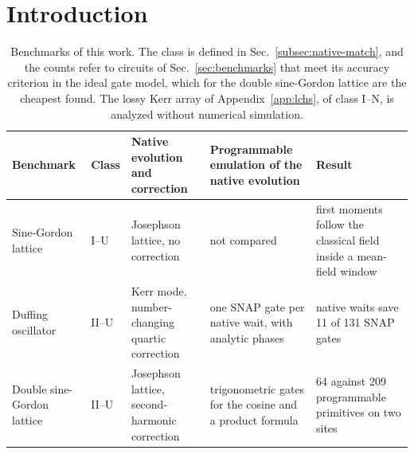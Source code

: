 \documentclass[pra,twocolumn,superscriptaddress,nofootinbib,floatfix]{revtex4-2}
\theoremstyle{remark}
\newcommand{\revcolor}{\color{blue}}
\begin{document}
\section{Introduction}
\label{sec:intro}

\begin{table}[t]
\revcolor
\caption{Benchmarks of this work. The class is defined in Sec.~\ref{subsec:native-match}, and the counts refer to circuits of Sec.~\ref{sec:benchmarks} that meet its accuracy criterion in the ideal gate model, which for the double sine-Gordon lattice are the cheapest found. The lossy Kerr array of Appendix~\ref{app:lchs}, of class I--N, is analyzed without numerical simulation.}
\label{tab:classes}
\begin{ruledtabular}
\begin{tabular}{L{2.5cm}L{0.8cm}L{3.5cm}L{4.1cm}L{4.4cm}}
Benchmark & Class & Native evolution and correction & Programmable emulation of the native evolution & Result \\
\hline
Sine-Gordon lattice & I--U & Josephson lattice, no correction & not compared & first moments follow the classical field inside a mean-field window \\
Duffing oscillator & II--U & Kerr mode, number-changing quartic correction & one SNAP gate per native wait, with analytic phases & native waits save 11 of 131 SNAP gates \\
Double sine-Gordon lattice & II--U & Josephson lattice, second-harmonic correction & trigonometric gates for the cosine and a product formula & 64 against 209 programmable primitives on two sites \\
\end{tabular}
\end{ruledtabular}
\end{table}
\end{document}
